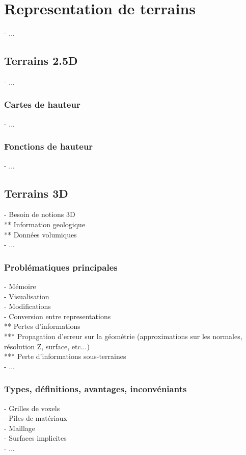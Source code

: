 \section{Representation de terrains}
\label{sec:introduction_terrain-representations}
- ...

\subsection{Terrains 2.5D}
- ...

\subsubsection{Cartes de hauteur}
- ...

\subsubsection{Fonctions de hauteur}
- ...

\subsection{Terrains 3D}
- Besoin de notions 3D \\
** Information geologique \\
** Données volumiques \\
- ...

\subsubsection{Problématiques principales}
- Mémoire \\
- Visualisation \\
- Modifications \\
- Conversion entre representations \\
** Pertes d'informations \\
*** Propagation d'erreur sur la géométrie (approximations sur les normales, résolution Z, surface, etc...) \\
*** Perte d'informations sous-terraines \\
- ...


\subsubsection{Types, définitions, avantages, inconvéniants}
- Grilles de voxels \\
- Piles de matériaux \\
- Maillage \\
- Surfaces implicites \\
- ...

